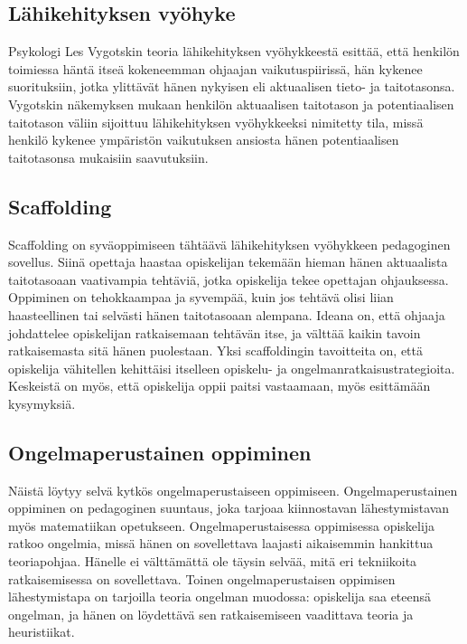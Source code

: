 \subsection{Lähikehityksen vyöhyke}
Psykologi Les Vygotskin teoria lähikehityksen vyöhykkeestä esittää, että henkilön toimiessa häntä itseä kokeneemman ohjaajan vaikutuspiirissä, hän kykenee suorituksiin, jotka ylittävät hänen nykyisen eli aktuaalisen tieto- ja taitotasonsa. Vygotskin näkemyksen mukaan henkilön aktuaalisen taitotason ja potentiaalisen taitotason väliin sijoittuu lähikehityksen vyöhykkeeksi nimitetty tila, missä henkilö kykenee ympäristön vaikutuksen ansiosta hänen potentiaalisen taitotasonsa mukaisiin saavutuksiin.\cite{vygotsky1978mind}
\subsection{Scaffolding}
Scaffolding on syväoppimiseen tähtäävä lähikehityksen vyöhykkeen pedagoginen sovellus. Siinä opettaja haastaa opiskelijan tekemään hieman hänen aktuaalista taitotasoaan vaativampia tehtäviä, jotka opiskelija tekee opettajan ohjauksessa. Oppiminen on tehokkaampaa ja syvempää, kuin jos tehtävä olisi liian haasteellinen tai selvästi hänen taitotasoaan alempana. Ideana on, että ohjaaja johdattelee opiskelijan ratkaisemaan tehtävän itse, ja välttää kaikin tavoin ratkaisemasta sitä hänen puolestaan. Yksi scaffoldingin tavoitteita on, että opiskelija vähitellen kehittäisi itselleen opiskelu- ja ongelmanratkaisustrategioita. Keskeistä on myös, että opiskelija oppii paitsi vastaamaan, myös esittämään kysymyksiä.\cite{kirschnerswellerclark}
\subsection{Ongelmaperustainen oppiminen}
Näistä löytyy selvä kytkös ongelmaperustaiseen oppimiseen. Ongelmaperustainen oppiminen on pedagoginen suuntaus, joka tarjoaa kiinnostavan lähesty\-mistavan myös matematiikan opetukseen. Ongelmaperustaisessa oppimisessa opiskelija ratkoo ongelmia, missä hänen on sovellettava laajasti aikaisemmin hankittua teoriapohjaa. Hänelle ei välttämättä ole täysin selvää, mitä eri tekniikoita ratkaisemisessa on sovellettava. Toinen ongelmaperustaisen oppimisen lähestymistapa on tarjoilla teoria ongelman muodossa: opis\-kelija saa eteensä ongelman, ja hänen on löydettävä sen ratkaisemiseen vaadittava teoria ja heuristiikat.\cite{schoenfeld}

